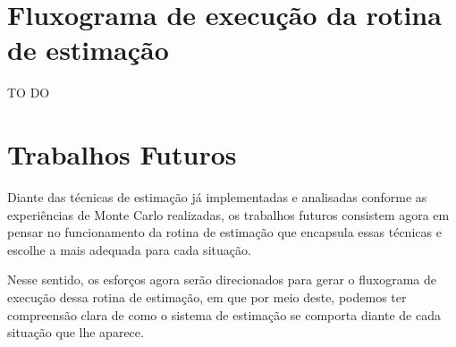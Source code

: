\documentclass[12pt]{article}
\begin{document}
\section{Fluxograma de execução da rotina de estimação}
TO DO

\section{Trabalhos Futuros}

Diante das técnicas de estimação já implementadas e analisadas conforme as experiências de Monte Carlo realizadas, os trabalhos futuros consistem agora em pensar no funcionamento da rotina de estimação que encapsula essas técnicas e escolhe a mais adequada para cada situação.

Nesse sentido, os esforços agora serão direcionados para gerar o fluxograma de execução dessa rotina de estimação, em que por meio deste, podemos ter compreensão clara de como o sistema de estimação se comporta diante de cada situação que lhe aparece.


\newpage

%

%
\end{document}
